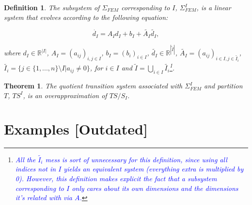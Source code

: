 \documentclass{article}
\newtheorem{theorem}{Theorem}
\newtheorem{definition}{Definition}
\newtheorem{problem}{Problem}
\newcommand*{\R}{\mathbb{R}}
\newcommand*{\fran}[1]{\textcolor{blue}{#1}}
\begin{document}
\begin{definition}

The subsystem of $\Sigma_{FEM}$ corresponding to $I$,
$\Sigma_{FEM}^I$, is a linear system that evolves according to the following
equation:

\begin{equation}
    \dot{d_I} = A_I d_I + b_I + \tilde{A_I}\tilde{d_I},
\end{equation}

where $d_I \in \R^{|I|}$, $A_I = (a_{ij})_{i, j \in I}$, $b_I = (b_i)_{i
\in I}$, $\tilde{d_I} \in \R^{|\tilde{I}|} $, $\tilde{A_I} = (a_{ij})_{i \in I, j
\in \tilde{I_i}}$, $\tilde{I_i} = \{j \in \{1,...,n\} \setminus I | a_{ij} \neq 0\}$, for $i
\in I$ and $\tilde{I} = \bigcup_{i \in I} \tilde{I_i}$\footnote{\fran{All the
$\tilde{I_i}$ mess is sort of unnecessary for this definition, since using all
indices not in $I$ yields an equivalent system (everything extra is multiplied
by 0). However, this definition makes explicit the fact that a subsystem
corresponding to $I$ only cares about its own dimensions and the dimensions it's
related with via $A$.}}.

\end{definition}

%
%
%
%
%     
%

\begin{theorem}

The quotient transition system associated with $\Sigma_{FEM}^I$ and
partition $T$, $TS^I$, is an overapproximation of $TS/S_I$.
    
\end{theorem}

\fi

\section{Examples [Outdated]}
\label{sec:examples}
\end{document}
